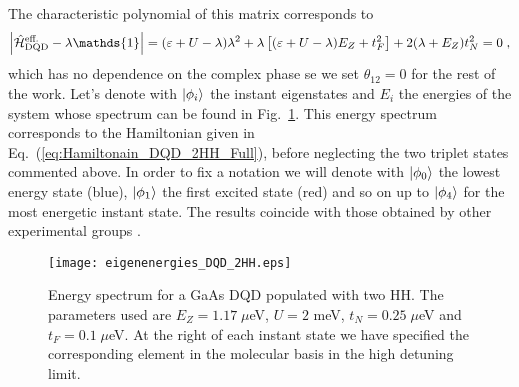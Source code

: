 The characteristic polynomial of this matrix corresponds to
\begin{equation}
	\abs{\hat{\mathcal{H}}_{\text{DQD}}^{\text{eff.}}-\lambda\mathds{1}}=(\varepsilon+U-\lambda)\lambda^2+\lambda\left[(\varepsilon+U-\lambda)E_Z+t_F^2\right]+2(\lambda+E_Z)t_N^2=0\; ,
\end{equation}
which has no dependence on the complex phase se we set $\theta_{12}=0$ for the rest of the work. Let's denote with $\ket{\phi_i}$ the instant eigenstates and $E_i$ the energies of the system whose spectrum can be found in Fig.~\ref{fig:eigenenergies_DQD_2HH}. This energy spectrum corresponds to the Hamiltonian given in Eq.~(\ref{eq:Hamiltonain_DQD_2HH_Full}), before neglecting the two triplet states commented above. In order to fix a notation we will denote with $\ket{\phi_0}$ the lowest energy state (blue), $\ket{\phi_1}$ the first excited state (red) and so on up to $\ket{\phi_4}$ for the most energetic instant state. The results coincide with those obtained by other experimental groups \cite{SachrajdaUnpublished}.
\begin{figure}[!htbp]
	\centering
	\texttt{[image: eigenenergies\_DQD\_2HH.eps]}
	\caption{Energy spectrum for a GaAs DQD populated with two HH. The parameters used are $E_Z=1.17\; \mu$eV, $U=2$ meV, $t_N=0.25\; \mu$eV and $t_F=0.1\; \mu$eV. At the right of each instant state we have specified the corresponding element in the molecular basis in the high detuning limit.}
	\label{fig:eigenenergies_DQD_2HH}
\end{figure}


